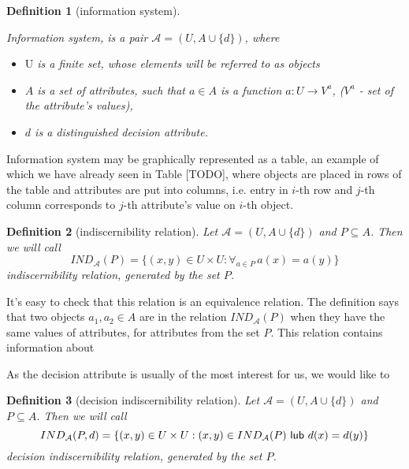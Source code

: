 \documentclass[12pt]{pracamgr}
\newtheorem{definition}{Definition}[chapter]
\begin{document}
\begin{definition}[information system]\label{infsysdef}

\emph{Information system}, is a pair $\mathcal{A} = (U, A \cup \{d\})$, where
  \begin{itemize}
    \item $\textrm{U}$ is a finite set, whose elements will be referred to as \emph{objects}
    \item $A$ is a set of \emph{attributes}, such that $a \in A$ is a function
    $a : U \to V^a$, ($V^a$ - set of the attribute's values),
    \item $d$ is a distinguished \emph{decision attribute}.
  \end{itemize}

\end{definition}

Information system may be graphically represented as a table, an example of which we have 
already seen in Table [TODO], where objects are placed in rows of the table and 
attributes are put into columns, i.e. entry in $i$-th row and $j$-th column corresponds
to $j$-th attribute's value on $i$-th object.

\begin{definition}[indiscernibility relation]

  Let $\mathcal{A} = (U, A \cup \{d\})$  and $P \subseteq A$. Then we will call
  $$
    IND_\mathcal{A}(P) = \{(x, y) \in U \times U : \forall_{a \in P} \, a(x) = a(y) \}
  $$
  \emph{indiscernibility relation, generated by the set $P$}.

\end{definition}

It's easy to check that this relation is an equivalence relation. The definition says that
two objects $a_1, a_2 \in A$ are in the relation $IND_\mathcal{A}(P)$ when they have the
same values of attributes, for attributes from the set $P$. This relation contains
information about 

As the decision attribute is usually of the most interest for us, we would like to 

\begin{definition}[decision indiscernibility relation]

  Let $\mathcal{A} = (U, A \cup \{d\})$  and $P \subseteq A$. Then we will call
  $$
    IND_\mathcal{A}(P, d) = \{(x, y) \in U \times U : (x,y) \in IND_\mathcal{A}(P)\\
    \textsf{ lub } d(x) = d(y)\}
  $$
  \emph{decision} indiscernibility relation, generated by the set $P$.

\end{definition}
\end{document}
